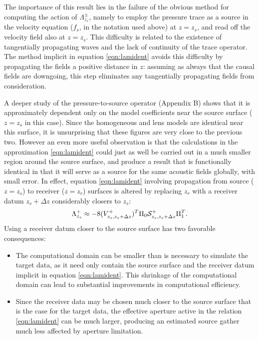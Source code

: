 The importance of this result lies in the failure of the obvious
method for computing the action of $\Lambda^{\pm}_{z_s}$, namely to
employ the pressure trace as a source in the velocity equation ($f_s$,
in the notation used above) at $z=z_s$, and read off the velocity
field also at $z=z_s$. This difficulty is related to the existence of
tangentially propagating waves and the lack of continuity of the trace
operator. The method implicit in equation \ref{eqn:lamident} avoids
this difficulty by propagating the fields a positive distance in $z$:
assuming as always that the causal fields are downgoing, this step
eliminates any tangentially propagating fields from consideration.


A deeper study of the pressure-to-source
operator (Appendix B) shows that it is approximately dependent only on the model
coefficients near the source surface ($z=z_s$ in this case). Since the
homogeneous and lens models are identical near this surface, it is
unsurprising that these figures are very close to the previous two.
However an even more useful observation is that the calculations in
the approximation \ref{eqn:lamident} could just as well be carried out
in a much smaller region around the source surface, and produce a
result that is functionally identical in that it will serve as a
source for the same acoustic fields globally, with small error. In
effect, equation \ref{eqn:lamident} involving propagation from source
($z=z_s$) to receiver ($z=z_r$) surfaces is altered by replacing $z_r$
with a receiver datum $z_s+\Delta z$ considerably closers to $z_s$:
\begin{equation}
  \label{eqn:lamnear}
  \Lambda^+_{z_s} \approx -8(V^{+}_{z_s,z_s+\Delta z})^T\Pi_0 {\cal
    S}^+_{z_s,z_s+\Delta z}\Pi_1^T.
\end{equation}
Using a receiver datum closer to the source surface has two favorable consequences:
\begin{itemize}
\item The computational domain can be smaller than is necessary to
  simulate the target data, as it need only contain the source
  surface and the receiver datum implicit in
  equation \ref{eqn:lamident}. This shrinkage of the computational
  domain can lead to substantial improvements in computational
  efficiency.
\item Since the receiver data may be chosen much closer to the
  source surface that is the case for the target data, the effective
  aperture active in the relation \ref{eqn:lamident} can be much
  larger, producing an estimated source gather much less affected by
  aperture limitation.
\end{itemize}


